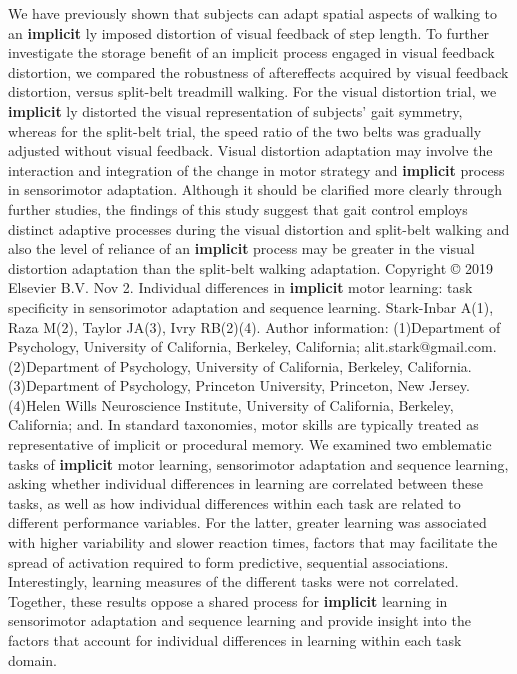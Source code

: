 \documentclass[11pt]{article}
\begin{document}
\newline  [  45  ]   We have previously shown that subjects can adapt spatial aspects of  walking to an   \textbf {  implicit  }  ly imposed distortion of visual feedback of step length.  To further investigate the storage benefit of an implicit process engaged in  visual feedback distortion, we compared the robustness of aftereffects acquired  by visual feedback distortion, versus split-belt treadmill walking.
\newline  [  46  ]   For the  visual distortion trial, we   \textbf {  implicit  }  ly distorted the visual representation of  subjects' gait symmetry, whereas for the split-belt trial, the speed ratio of  the two belts was gradually adjusted without visual feedback.
\newline  [  47  ]   Visual distortion adaptation may involve the interaction  and integration of the change in motor strategy and   \textbf {  implicit  }   process in  sensorimotor adaptation.
\newline  [  48  ]   Although it should be clarified more clearly through  further studies, the findings of this study suggest that gait control employs  distinct adaptive processes during the visual distortion and split-belt walking  and also the level of reliance of an   \textbf {  implicit  }   process may be greater in the  visual distortion adaptation than the split-belt walking adaptation.  Copyright © 2019 Elsevier B.V.
\newline  [  49  ]  Nov 2.  Individual differences in   \textbf {  implicit  }   motor learning: task specificity in  sensorimotor adaptation and sequence learning.  Stark-Inbar A(1), Raza M(2), Taylor JA(3), Ivry RB(2)(4).  Author information: (1)Department of Psychology, University of California, Berkeley, California;  alit.stark@gmail.com. (2)Department of Psychology, University of California, Berkeley, California. (3)Department of Psychology, Princeton University, Princeton, New Jersey. (4)Helen Wills Neuroscience Institute, University of California, Berkeley,  California; and.  In standard taxonomies, motor skills are typically treated as representative of  implicit or procedural memory.
\newline  [  50  ]   We examined two emblematic tasks of   \textbf {  implicit  }    motor learning, sensorimotor adaptation and sequence learning, asking whether  individual differences in learning are correlated between these tasks, as well  as how individual differences within each task are related to different  performance variables.
\newline  [  51  ]   For the latter, greater learning was associated  with higher variability and slower reaction times, factors that may facilitate  the spread of activation required to form predictive, sequential associations.  Interestingly, learning measures of the different tasks were not correlated.  Together, these results oppose a shared process for   \textbf {  implicit  }   learning in  sensorimotor adaptation and sequence learning and provide insight into the  factors that account for individual differences in learning within each task  domain.
\end{document}
